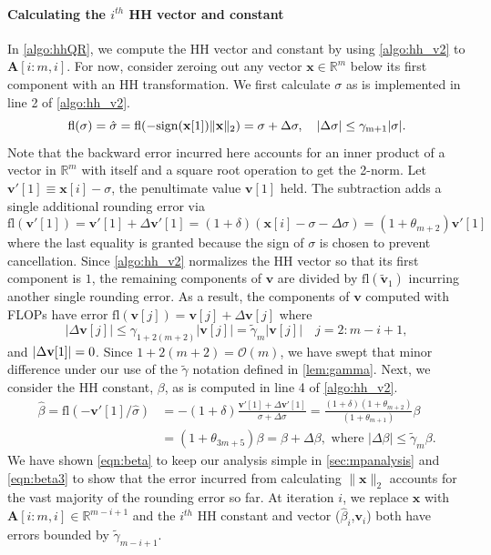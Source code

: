 \documentclass[review,onefignum,onetabnum]{siamart190516}
\newcommand{\R}{\mathbb{R}}
\newcommand{\dd}{\delta}
\newcommand{\tth}{\theta}
\newcommand{\bb}[1]{\mathbf{#1}}
\newcommand{\fl}{\mathrm{fl}}
\newcommand{\cO}{\mathcal{O}}
\begin{document}
\paragraph{Calculating the $i^{th}$ HH vector and constant} 
In \cref{algo:hhQR}, we compute the HH vector and constant by using \cref{algo:hh_v2} to $\bb{A}[i:m,i]$.
For now, consider zeroing out any vector $\bb{x}\in\R^m$ below its first component with an HH transformation.
We first calculate $\sigma$ as is implemented in line 2 of \cref{algo:hh_v2}.
\begin{equation}
\label{eqn:sigma}
\fl(\sigma) = \hat{\sigma} = \rm{fl}(-\rm{sign}(\bb{x}[1])\|\bb{x}\|_2) = \sigma + \Delta \sigma,\quad |\Delta\sigma| \leq \gamma_{m+1}|\sigma|.
\end{equation}
Note that the backward error incurred here accounts for an inner product of a vector in $\R^{m}$ with itself and a square root operation to get the 2-norm. 
Let $\bb{v}'[1]\equiv \bb{x}[i]-\sigma$, the penultimate value $\bb{v}[1]$ held. 
The subtraction adds a single additional rounding error via
\begin{equation}
	\fl(\bb{v}'[1]) =\bb{v}'[1] + \Delta \bb{v}'[1] = (1+\dd) (\bb{x}[i]-\sigma-\Delta\sigma)= (1+\tth_{m+2})\bb{v}'[1]
\end{equation}
where the last equality is granted because the sign of $\sigma$ is chosen to prevent cancellation.
Since \cref{algo:hh_v2} normalizes the HH vector so that its first component is $1$, the remaining components of $\bb{v}$ are divided by $\fl(\tilde{\bb{v}}_1)$ incurring another single rounding error.
As a result, the components of $\bb{v}$ computed with FLOPs have error $\fl(\bb{v}[j])	= \bb{v}[j] + \Delta \bb{v}[j]$ where 
\begin{equation}
|\Delta \bb{v}[j]|\leq \gamma_{1+2(m+2)}|\bb{v}[j]| =\tilde{\gamma}_{m}|\bb{v}[j]|\quad j=2:m-i+1,\label{eqn:vbound}
\end{equation}
and $|\Delta {\bf v}[1]| = 0$.
Since $1+2(m+2) = \cO(m)$, we have swept that minor difference under our use of the $\tilde{\gamma}$ notation defined in \cref{lem:gamma}.
Next, we consider the HH constant, $\beta$, as is computed in line 4 of \cref{algo:hh_v2}.
\begin{align}
\hat{\beta} = \fl\left(-\bb{v}'[1]/\hat{\sigma}\right) &=-(1+\dd)\frac{\bb{v}'[1]+\Delta \bb{v}'[1]}{\sigma + \Delta\sigma} = \frac{(1+\dd)(1+\tth_{m+2})}{(1+\tth_{m+1})}\beta \label{eqn:beta}\\
&= (1+\tth_{3m+5})\beta= \beta + \Delta \beta,\text{ where } |\Delta\beta| \leq \tilde{\gamma}_{m} \beta\label{eqn:beta3}.
\end{align}
We have shown \cref{eqn:beta} to keep our analysis simple in \cref{sec:mpanalysis} and \cref{eqn:beta3} to show that the error incurred from calculating $\|\bb{x}\|_2$ accounts for the vast majority of the rounding error so far.
At iteration $i$, we replace $\bb{x}$ with $\bb{A}[i:m,i]\in\R^{m-i+1}$ and the $i^{th}$ HH constant and vector ($\hat{\beta}_i$,$\bb{v}_i$) both have errors bounded by $\tilde{\gamma}_{m-i+1}$.
\end{document}

